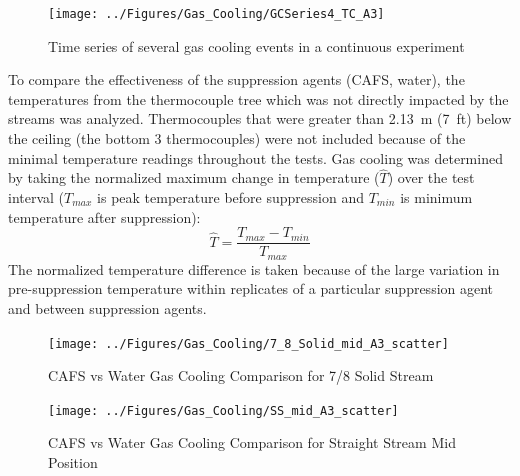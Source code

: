 \documentclass[12pt,oneside]{book}
\begin{document}
\begin{figure}[ht!]
	\texttt{[image: ../Figures/Gas\_Cooling/GCSeries4\_TC\_A3]}
	\caption{Time series of several gas cooling events in a continuous experiment}
	\label{fig:gas_cooling_exp4}
\end{figure}

To compare the effectiveness of the suppression agents (CAFS, water), the temperatures from the thermocouple tree which was not directly impacted by the streams was analyzed. Thermocouples that were greater than 2.13~m (7~ft) below the ceiling (the bottom 3 thermocouples) were not included because of the minimal temperature readings throughout the tests. Gas cooling was determined by taking the normalized maximum change in temperature ($\hat{T}$) over the test interval ($T_{max}$ is peak temperature before suppression and $T_{min}$ is minimum temperature after suppression):
\begin{equation}
\label{eq:norm_temp}
\hat{T} = \frac{T_{max}-T_{min}}{T_{max}}
\end{equation}
The normalized temperature difference is taken because of the large variation in pre-suppression temperature within replicates of a particular suppression agent and between suppression agents.

\begin{figure}[!ht]
	\texttt{[image: ../Figures/Gas\_Cooling/7\_8\_Solid\_mid\_A3\_scatter]}
	\caption{CAFS vs Water Gas Cooling Comparison for 7/8 Solid Stream}
	\label{fig:CAFS_Water_Comp_7_8}
\end{figure}

\begin{figure}[!ht]
	\texttt{[image: ../Figures/Gas\_Cooling/SS\_mid\_A3\_scatter]}
	\caption{CAFS vs Water Gas Cooling Comparison for Straight Stream Mid Position}
	\label{fig:CAFS_Water_Comp_SS_mid}
\end{figure}

\clearpage
\end{document}
